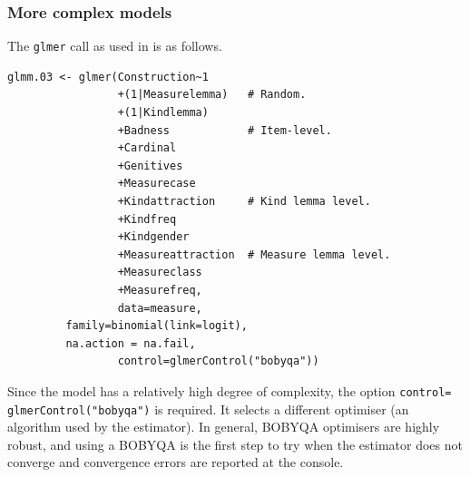 \subsubsection{More complex models}
\label{sec:morecomplexmodelspractical}

The \texttt{glmer} call as used in \citet{Schaefer2018} is as follows.

\vspace{0.5\baselineskip}

\begin{lstlisting}
glmm.03 <- glmer(Construction~1
                 +(1|Measurelemma)   # Random.
                 +(1|Kindlemma)
                 +Badness            # Item-level.
                 +Cardinal
                 +Genitives
                 +Measurecase
                 +Kindattraction     # Kind lemma level.
                 +Kindfreq
                 +Kindgender
                 +Measureattraction  # Measure lemma level.
                 +Measureclass
                 +Measurefreq,
                 data=measure,
		 family=binomial(link=logit),
		 na.action = na.fail,
                 control=glmerControl("bobyqa"))
\end{lstlisting}

Since the model has a relatively high degree of complexity, the option \texttt{control=} \texttt{glmerControl("bobyqa")} is required.
It selects a different optimiser (an algorithm used by the estimator).
In general, BOBYQA optimisers are highly robust, and using a BOBYQA is the first step to try when the estimator does not converge and convergence errors are reported at the console.


